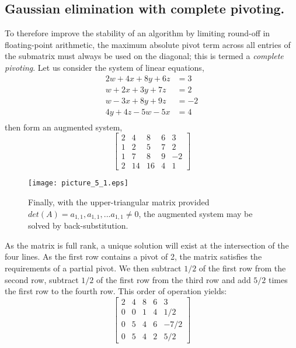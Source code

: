\documentclass[7pt]{article}
\begin{document}
\subsection*{Gaussian elimination with complete pivoting.}
To therefore improve the stability of an algorithm by limiting round-off in floating-point arithmetic, the maximum absolute pivot term across all entries of the submatrix must always be used on the diagonal; this is termed a \emph{complete pivoting}. Let us consider the system of linear equations, 
\begin{equation*}
\begin{split}
2w + 4x + 8y + 6z & = 3 \\
w + 2x + 3y + 7z & = 2 \\
w  - 3x + 8y + 9z & = -2 \\
4y + 4z -5w  -5x   & = 4 \\
\end{split}
\end{equation*}
then form an augmented system, 
\begin{equation*}
\left[
\begin{array}{rrrr|r}%
2 & 4 & 8  & 6 & 3 \\  
1 & 2 & 5 & 7  & 2\\  
 1 & 7 & 8  & 9  &-2\\  
 2  & 14 & 16 & 4  & 1
\end{array}  
\right]  
\end{equation*}
\begin{figure}
	\begin{minipage}[c]{0.3\textwidth}
		\caption{
			Finally, with the upper-triangular matrix provided $det(A) = a_{1,1}, a_{1,1},...a_{1,1} \neq 0$, the augmented system may be solved by back-substitution.
		} \label{fig:03-03}
	\end{minipage}
	\begin{minipage}[c]{0.67\textwidth}
		\texttt{[image: picture\_5\_1.eps]}
	\end{minipage}\hfill
\end{figure}
As the matrix is full rank, a unique solution will exist at the intersection of the four lines. As the first row contains a pivot of 2, the matrix satisfies the requirements of a partial pivot. We then subtract $1/2$ of the first row from the second row,  subtract $1/2$ of the first row from  the third row and add $5/2$ times the first row to the fourth row. This order of operation yields:
\begin{equation*}
\left[
\begin{array}{rrrr|r}%
2 & 4 & 8  & 6 & 3 \\  
0 & 0 & 1 & 4  & 1/2 \\
0 & 5  & 4  & 6  &-7/2\\  
0 &  5 &  4 & 2  & 5 / 2
\end{array}  
\right]
\end{equation*}
\end{document}
